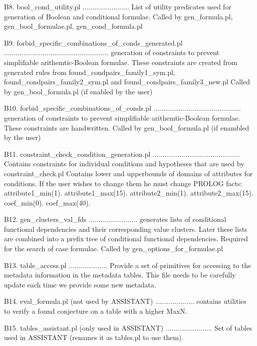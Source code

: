 B8. bool_cond_utility.pl
........................
 List of utility predicates used for generation of Boolean and conditional formulae.
 Called by gen_formula.pl, gen_bool_formulae.pl, gen_cond_formula.pl

B9. forbid_specific_combinations_of_conds_generated.pl
......................................................
 generation of constraints to prevent simplifiable arithemtic-Boolean formulae.
 These constraints are created from generated rules from found_condpairs_family1_sym.pl,
 found_condpairs_family2_sym.pl and found_condpairs_family3_new.pl
 Called by gen_bool_formula.pl (if enabled by the user)
 
B10. forbid_specific_combinations_of_conds.pl
.............................................
 generation of constraints to prevent simplifiable arithemtic-Boolean formulae.
 These constraints are handwritten.
 Called by gen_bool_formula.pl (if enambled by the user)

B11. constraint_check_condition_generation.pl
.............................................
 Contains constraints for individual conditions and hypotheses that are used by constraint_check.pl
 Contains lower and upperbounds of domains of attributes for conditions. If the user wishes
 to change them he must change PROLOG facts:
  attribute1_min(1).
  attribute1_max(15). %
  attribute2_min(1).
  attribute2_max(15). %
  coef_min(0).
  coef_max(40).       %

B12. gen_clusters_val_fds
.........................
 generates lists of conditional functional dependencies and their corresponding value clusters. Later
 these lists are combined into a prefix tree of conditional functional dependencies. Required for the
 search of case formulae.
 Called by gen_options_for_formulae.pl
 
B13. table_access.pl
....................
 Provide a set of primitives for accessing to the metadata information
 in the metadata tables. This file needs to be carefully update each time
 we provide some new metadata.

B14. eval_formula.pl (not used by ASSISTANT)
....................
 contains utilities to verify a found conjecture on a table with a higher MaxN.

B15. tables_assistant.pl  (only used in ASSISTANT)
........................
 Set of tables used in ASSISTANT (renames it as tables.pl to use them).


